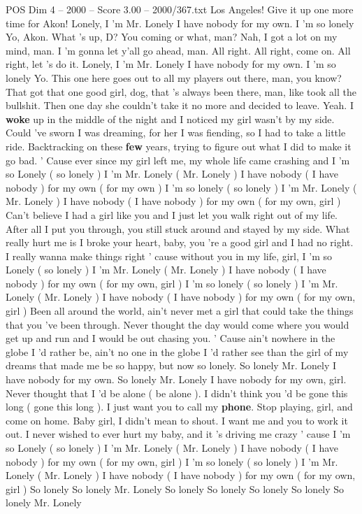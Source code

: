 \begin{textsample}{POS Dim 4 – 2000 – Score 3.00 – 2000/367.txt}  \label{ex:f4_pos_001}
Los Angeles!
Give it up one more time for Akon!
Lonely, I 'm Mr.
Lonely I have nobody for my own.
I 'm so lonely Yo, Akon.
What 's up, D?
You coming or what, man?
Nah, I got a lot on my mind, man.
I 'm gonna let y'all go ahead, man.
All right.
All right, come on.
All right, let 's do it.
Lonely, I 'm Mr.
Lonely I have nobody for my own.
I 'm so lonely Yo.
This one here goes out to all my players out there, man, you know?
That got that one good girl, dog, that 's always been there, man, like took all the bullshit.
Then one day she couldn't take it no more and decided to leave.
Yeah.
I \textbf{woke} up in the middle of the night and I noticed my girl wasn't by my side.
Could 've sworn I was dreaming, for her I was fiending, so I had to take a little ride.
Backtracking on these \textbf{few} years, trying to figure out what I did to make it go bad. ' Cause ever since my girl left me, my whole life came crashing and I 'm so Lonely ( so lonely ) I 'm Mr.
Lonely ( Mr.
Lonely ) I have nobody ( I have nobody ) for my own ( for my own ) I 'm so lonely ( so lonely ) I 'm Mr.
Lonely ( Mr.
Lonely ) I have nobody ( I have nobody ) for my own ( for my own, girl ) Can't believe I had a girl like you and I just let you walk right out of my life.
After all I put you through, you still stuck around and stayed by my side.
What really hurt me is I broke your heart, baby, you 're a good girl and I had no right.
I really wanna make things right ' cause without you in my life, girl, I 'm so Lonely ( so lonely ) I 'm Mr.
Lonely ( Mr.
Lonely ) I have nobody ( I have nobody ) for my own ( for my own, girl ) I 'm so lonely ( so lonely ) I 'm Mr.
Lonely ( Mr.
Lonely ) I have nobody ( I have nobody ) for my own ( for my own, girl ) Been all around the world, ain't never met a girl that could take the things that you 've been through.
Never thought the day would come where you would get up and run and I would be out chasing you. ' Cause ain't nowhere in the globe I 'd rather be, ain't no one in the globe I 'd rather see than the girl of my dreams that made me be so happy, but now so lonely.
So lonely Mr.
Lonely I have nobody for my own.
So lonely Mr.
Lonely I have nobody for my own, girl.
Never thought that I 'd be alone ( be alone ).
I didn't think you 'd be gone this long ( gone this long ).
I just want you to call my \textbf{phone}.
Stop playing, girl, and come on home.
Baby girl, I didn't mean to shout.
I want me and you to work it out.
I never wished to ever hurt my baby, and it 's driving me crazy ' cause I 'm so Lonely ( so lonely ) I 'm Mr.
Lonely ( Mr.
Lonely ) I have nobody ( I have nobody ) for my own ( for my own, girl ) I 'm so lonely ( so lonely ) I 'm Mr.
Lonely ( Mr.
Lonely ) I have nobody ( I have nobody ) for my own ( for my own, girl ) So lonely So lonely Mr.
Lonely So lonely So lonely So lonely So lonely So lonely Mr.
Lonely

\end{textsample}
